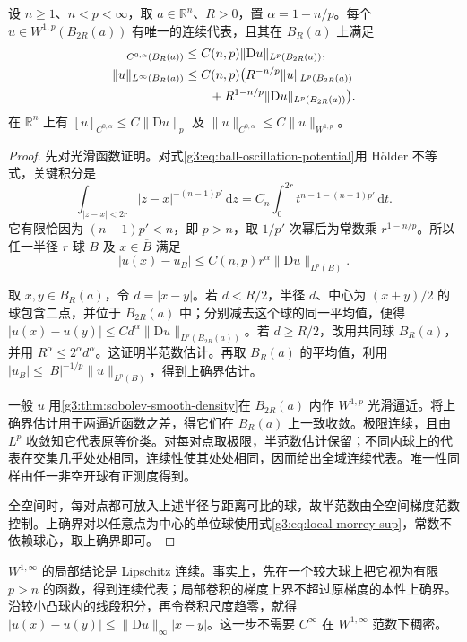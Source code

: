 \begin{theorem}[Morrey 估计]\label{g3:thm:local-morrey}
	设 \(n\ge1\)、\(n<p<\infty\)，取 \(a\in\mathbb R^n\)、\(R>0\)，置 \(\alpha=1-n/p\)。每个 \(u\in W^{1,p}(B_{2R}(a))\) 有唯一的连续代表，且其在 \(B_R(a)\) 上满足
	\begin{align}
		[u]_{C^{0,\alpha}(B_R(a))}&\le C(n,p)\|\mathrm Du\|_{L^p(B_{2R}(a))},\label{g3:eq:local-morrey-seminorm}\\
		\|u\|_{L^\infty(B_R(a))}&\le C(n,p)\bigl(R^{-n/p}\|u\|_{L^p(B_{2R}(a))}\notag\\
		&\qquad+R^{1-n/p}\|\mathrm Du\|_{L^p(B_{2R}(a))}\bigr).\label{g3:eq:local-morrey-sup}
	\end{align}
	在 \(\mathbb R^n\) 上有 \([u]_{C^{0,\alpha}}\le C\|\mathrm Du\|_p\) 及 \(\|u\|_{C^{0,\alpha}}\le C\|u\|_{W^{1,p}}\)。
\end{theorem}
\begin{proof}
	先对光滑函数证明。对式\eqref{g3:eq:ball-oscillation-potential}用 Hölder 不等式，关键积分是
	\[
		\int_{|z-x|<2r}|z-x|^{-(n-1)p'}\,\mathrm dz
		=C_n\int_0^{2r}t^{n-1-(n-1)p'}\,\mathrm dt.
	\]
	它有限恰因为 \((n-1)p'<n\)，即 \(p>n\)，取 \(1/p'\) 次幂后为常数乘 \(r^{1-n/p}\)。所以任一半径 \(r\) 球 \(B\) 及 \(x\in\overline B\) 满足
	\[
		|u(x)-u_B|\le C(n,p)r^\alpha\|\mathrm Du\|_{L^p(B)}.
	\]

	取 \(x,y\in B_R(a)\)，令 \(d=|x-y|\)。若 \(d<R/2\)，半径 \(d\)、中心为 \((x+y)/2\) 的球包含二点，并位于 \(B_{2R}(a)\) 中；分别减去这个球的同一平均值，便得 \(|u(x)-u(y)|\le Cd^\alpha\|\mathrm Du\|_{L^p(B_{2R}(a))}\)。若 \(d\ge R/2\)，改用共同球 \(B_R(a)\)，并用 \(R^\alpha\le2^\alpha d^\alpha\)。这证明半范数估计。再取 \(B_R(a)\) 的平均值，利用 \(|u_B|\le |B|^{-1/p}\|u\|_{L^p(B)}\)，得到上确界估计。

	一般 \(u\) 用\cref{g3:thm:sobolev-smooth-density}在 \(B_{2R}(a)\) 内作 \(W^{1,p}\) 光滑逼近。将上确界估计用于两逼近函数之差，得它们在 \(B_R(a)\) 上一致收敛。极限连续，且由 \(L^p\) 收敛知它代表原等价类。对每对点取极限，半范数估计保留；不同内球上的代表在交集几乎处处相同，连续性使其处处相同，因而给出全域连续代表。唯一性同样由任一非空开球有正测度得到。

	全空间时，每对点都可放入上述半径与距离可比的球，故半范数由全空间梯度范数控制。上确界对以任意点为中心的单位球使用式\eqref{g3:eq:local-morrey-sup}，常数不依赖球心，取上确界即可。
\end{proof}

\(W^{1,\infty}\) 的局部结论是 Lipschitz 连续。事实上，先在一个较大球上把它视为有限 \(p>n\) 的函数，得到连续代表；局部卷积的梯度上界不超过原梯度的本性上确界。沿较小凸球内的线段积分，再令卷积尺度趋零，就得 \(|u(x)-u(y)|\le\|\mathrm Du\|_\infty|x-y|\)。这一步不需要 \(C^\infty\) 在 \(W^{1,\infty}\) 范数下稠密。

